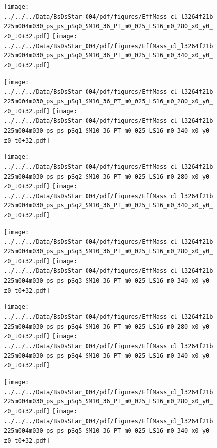 \documentclass[a4paper,10pt]{article}
\begin{document}
\begin{figure}[p]
 \texttt{[image: ../../../Data/BsDsStar\_004/pdf/figures/EffMass\_cl\_l3264f21b225m004m030\_ps\_ps\_pSq0\_SM10\_36\_PT\_m0\_025\_LS16\_m0\_280\_x0\_y0\_z0\_t0+32.pdf]} 
 \texttt{[image: ../../../Data/BsDsStar\_004/pdf/figures/EffMass\_cl\_l3264f21b225m004m030\_ps\_ps\_pSq0\_SM10\_36\_PT\_m0\_025\_LS16\_m0\_340\_x0\_y0\_z0\_t0+32.pdf]} 
 \end{figure}
\begin{figure}[p]
 \texttt{[image: ../../../Data/BsDsStar\_004/pdf/figures/EffMass\_cl\_l3264f21b225m004m030\_ps\_ps\_pSq1\_SM10\_36\_PT\_m0\_025\_LS16\_m0\_280\_x0\_y0\_z0\_t0+32.pdf]} 
 \texttt{[image: ../../../Data/BsDsStar\_004/pdf/figures/EffMass\_cl\_l3264f21b225m004m030\_ps\_ps\_pSq1\_SM10\_36\_PT\_m0\_025\_LS16\_m0\_340\_x0\_y0\_z0\_t0+32.pdf]} 
 \end{figure}
\begin{figure}[p]
 \texttt{[image: ../../../Data/BsDsStar\_004/pdf/figures/EffMass\_cl\_l3264f21b225m004m030\_ps\_ps\_pSq2\_SM10\_36\_PT\_m0\_025\_LS16\_m0\_280\_x0\_y0\_z0\_t0+32.pdf]} 
 \texttt{[image: ../../../Data/BsDsStar\_004/pdf/figures/EffMass\_cl\_l3264f21b225m004m030\_ps\_ps\_pSq2\_SM10\_36\_PT\_m0\_025\_LS16\_m0\_340\_x0\_y0\_z0\_t0+32.pdf]} 
 \end{figure}
\clearpage
\begin{figure}[p]
 \texttt{[image: ../../../Data/BsDsStar\_004/pdf/figures/EffMass\_cl\_l3264f21b225m004m030\_ps\_ps\_pSq3\_SM10\_36\_PT\_m0\_025\_LS16\_m0\_280\_x0\_y0\_z0\_t0+32.pdf]} 
 \texttt{[image: ../../../Data/BsDsStar\_004/pdf/figures/EffMass\_cl\_l3264f21b225m004m030\_ps\_ps\_pSq3\_SM10\_36\_PT\_m0\_025\_LS16\_m0\_340\_x0\_y0\_z0\_t0+32.pdf]} 
 \end{figure}
\begin{figure}[p]
 \texttt{[image: ../../../Data/BsDsStar\_004/pdf/figures/EffMass\_cl\_l3264f21b225m004m030\_ps\_ps\_pSq4\_SM10\_36\_PT\_m0\_025\_LS16\_m0\_280\_x0\_y0\_z0\_t0+32.pdf]} 
 \texttt{[image: ../../../Data/BsDsStar\_004/pdf/figures/EffMass\_cl\_l3264f21b225m004m030\_ps\_ps\_pSq4\_SM10\_36\_PT\_m0\_025\_LS16\_m0\_340\_x0\_y0\_z0\_t0+32.pdf]} 
 \end{figure}
\begin{figure}[p]
 \texttt{[image: ../../../Data/BsDsStar\_004/pdf/figures/EffMass\_cl\_l3264f21b225m004m030\_ps\_ps\_pSq5\_SM10\_36\_PT\_m0\_025\_LS16\_m0\_280\_x0\_y0\_z0\_t0+32.pdf]} 
 \texttt{[image: ../../../Data/BsDsStar\_004/pdf/figures/EffMass\_cl\_l3264f21b225m004m030\_ps\_ps\_pSq5\_SM10\_36\_PT\_m0\_025\_LS16\_m0\_340\_x0\_y0\_z0\_t0+32.pdf]} 
 \end{figure}
\clearpage
\clearpage
\end{document}
